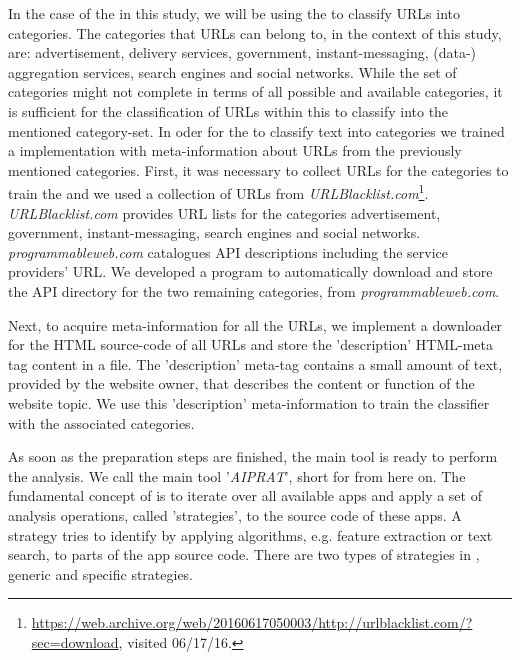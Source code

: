 In the case of the \sca in this study, we will be using the \nbc to classify URLs into categories.
The categories that URLs can belong to, in the context of this study, are: advertisement, delivery services, government, instant-messaging, (data-) aggregation services, search engines and social networks.
While the set of categories might not complete in terms of all possible and available categories, it is sufficient for the classification of URLs within this \sca to classify into the mentioned category-set.
In oder for the \nbc to classify text into categories we trained a \nbc implementation with meta-information about URLs from the previously mentioned categories.
First, it was necessary to collect URLs for the categories to train the \nbc and we used a collection of \acs{URL}s from \textit{URLBlacklist.com}\footnote{\url{https://web.archive.org/web/20160617050003/http://urlblacklist.com/?sec=download}, visited 06/17/16.}.
\textit{URLBlacklist.com} provides URL lists for the categories advertisement, government, instant-messaging, search engines and social networks.
\textit{programmableweb.com} catalogues API descriptions including the service providers' URL.
We developed a program to automatically download and store the API directory for the two remaining categories, from \textit{programmableweb.com}.

Next, to acquire meta-information for all the URLs, we implement a downloader for the HTML source-code of all URLs and store the 'description' HTML-meta tag content in a file.
The 'description' meta-tag contains a small amount of text, provided by the website owner, that describes the content or function of the website topic.
We use this 'description' meta-information to train the classifier with the associated categories.\newline

As soon as the preparation steps are finished, the main \sca tool is ready to perform the \ipr analysis.
We call the main \sca tool '\textit{AIPRAT}', short for \aiprat from here on.
The fundamental concept of \AIPRAT is to iterate over all available apps and apply a set of analysis operations, called 'strategies', to the source code of these apps.
A strategy tries to identify \iprfs by applying algorithms, e.g. feature extraction or text search, to parts of the app source code.
There are two types of strategies in \AIPRAT, generic and specific strategies.

